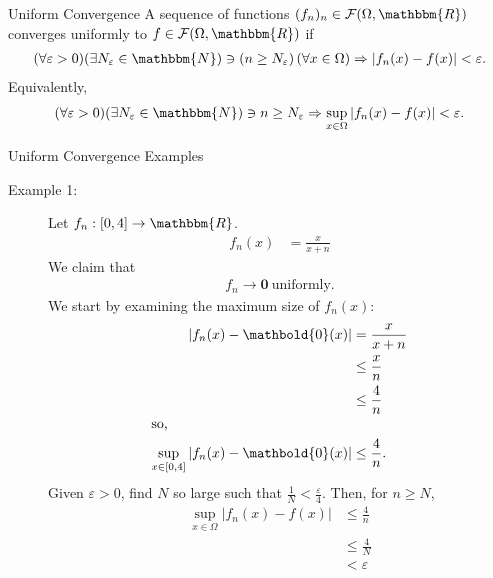 \documentclass[10pt]{extarticle}
\renewcommand{\mathbf}[1]{\mathbold{#1}}
\newcommand{\N}{\mathbbm{N}}
\newcommand{\R}{\mathbbm{R}}
\begin{document}
  \begin{problem}{Uniform Convergence}
    A sequence of functions $(f_n)_n\in \mathcal{F}(\Omega,\R)$ converges uniformly to $f\in \mathcal{F}(\Omega,\R)$ if
    \begin{align*}
      (\forall \varepsilon > 0)(\exists N_{\varepsilon}\in\N) \ni \left(n \geq N_{\varepsilon}\right)  (\forall x \in \Omega)\Rightarrow \left|f_n(x) - f(x)\right| < \varepsilon.
    \end{align*}
    Equivalently,
    \begin{align*}
      (\forall \varepsilon > 0)(\exists N_{\varepsilon}\in \N) \ni n\geq N_{\varepsilon} \Rightarrow \sup_{x\in\Omega}\left|f_n(x) - f(x)\right| < \varepsilon.
    \end{align*}
  \end{problem}
  \begin{problem}{Uniform Convergence Examples}
    \begin{description}
      \item[Example 1:] Let $f_n: [0,4] \rightarrow \R$.
        \begin{align*}
          f_n(x) &= \frac{x}{x+n}
        \end{align*}
        We claim that
        \begin{align*}
          f_n \rightarrow \mathbf{0}~\text{uniformly}.
        \end{align*}
        We start by examining the maximum size of $f_n(x)$:
        \begin{align*}
          \left|f_n(x) - \mathbf{0}(x)\right| &= \frac{x}{x+n}\\
                                              &\leq \frac{x}{n}\\
                                              &\leq \frac{4}{n}\\
                                              \shortintertext{so,}
          \sup_{x\in[0,4]}\left|f_n(x)-\mathbf{0}(x)\right|&\leq \frac{4}{n}.
        \end{align*}
        Given $\varepsilon > 0$, find $N$ so large such that $\frac{1}{N} < \frac{\varepsilon}{4}$. Then, for $n \geq N$,
        \begin{align*}
          \sup_{x\in\Omega}\left|f_n(x) - f(x) \right| &\leq \frac{4}{n}\\
                                                       &\leq \frac{4}{N}\\
                                                       &< \varepsilon
        \end{align*}
    \end{description}
  \end{problem}
\end{document}
